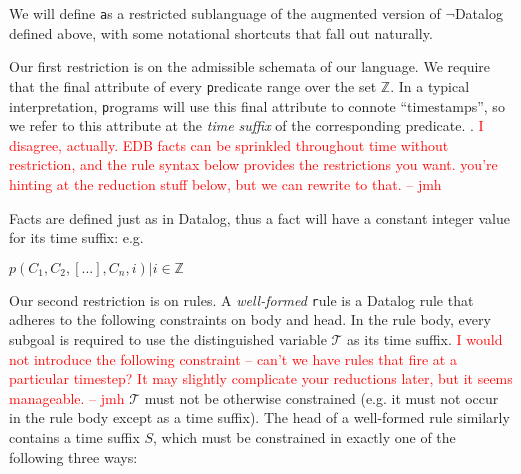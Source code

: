 \documentclass{acm_proc_article-sp-sigmod09}
\newcommand{\Tau}{\mathcal{T}}
\newcommand{\jmh}[1]{{\textcolor{red}{#1 -- jmh}}}
\newcommand{\wrm}[1]{{\color{BurntOrange}{#1 -- wrm}}}
\newcommand{\dedalus}[1]{\texttt{\fontsize{9pt}{9pt}\selectfont #1}}
\begin{document}
We will define \dedalus as a restricted sublanguage of the augmented version of $\lnot$Datalog defined above, with some notational shortcuts that fall out naturally.

Our first restriction is on the admissible schemata of our language. We  require that the final attribute of every \dedalus predicate range over the set $\mathbb{Z}$.  In a typical interpretation, \dedalus programs will use this final attribute to connote ``timestamps'', so we refer to this attribute at the \emph{time suffix} of the corresponding predicate.  \wrm{we really want an inclusion constraint not just in the set of integers, but in the set of all possible times, in case time is finite}.  \jmh{I disagree, actually.  EDB facts can be sprinkled throughout time without restriction, and the rule syntax below provides the restrictions you want.  you're hinting at the reduction stuff below, but we can rewrite to that.}  

Facts are defined just as in Datalog, thus a fact
will have a constant integer value for its time suffix: e.g.


$p(C_{1},C_{2},[...],C_{n}, i) |  i \in \mathbb{Z}$

Our second restriction is on rules.  A {\em well-formed }\dedalus rule is a Datalog rule that adheres to the following constraints on body and head.  
In the rule body, every
subgoal is required to use the distinguished variable $\Tau$ as its time suffix.  
\jmh{I would not introduce the following constraint -- can't we have rules that fire at a particular timestep?  It may slightly complicate your reductions later, but it seems manageable.}
$\Tau$ must not be otherwise
constrained (e.g. it must not occur in the rule body except as a time suffix).
The head of a well-formed rule similarly contains a time suffix $S$, which must
be constrained in exactly one of the following three ways:
\end{document}
